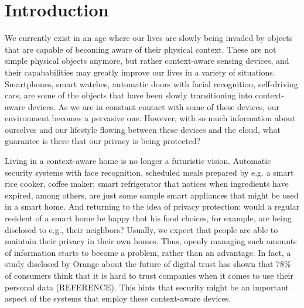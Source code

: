\documentclass[12pt]{article}
\newcommand{\TODO}{\todo[inline]}
\begin{document}


\newpage
\tableofcontents


\newpage
{}%


\newpage
\section{Introduction}

\TODO{(ref) references}

We currently exist in an age where our lives are slowly being invaded by objects that are capable of becoming aware of their physical context. These are not simple physical objects anymore, but rather context-aware sensing devices, and their capababilities may greatly improve our lives in a variety of situations. Smartphones, smart watches, automatic doors with facial recognition, self-driving cars, are some of the objects that have been slowly transitioning into context-aware devices. As we are in constant contact with some of these devices, our environment becomes a pervasive one. However, with so much information about ourselves and our lifestyle flowing between these devices and the cloud, what guarantee is there that our privacy is being protected?

Living in a context-aware home is no longer a futuristic vision. Automatic security systems with face recognition, scheduled meals prepared by e.g. a smart rice cooker, coffee maker; smart refrigerator that notices when ingredients have expired, among others, are just some sample smart appliances that might be used in a smart home. And returning to the idea of privacy protection: would a regular resident of a smart home be happy that his food choices, for example, are being disclosed to e.g., their neighbors? Usually, we expect that people are able to maintain their privacy in their own homes. Thus, openly managing such amounts of information starts to become a problem, rather than an advantage. In fact, a study disclosed by Orange about the future of digital trust has shown that 78\% of consumers think that it is hard to trust companies when it comes to use their personal data (REFERENCE). This hints that security might be an important aspect of the systems that employ these context-aware devices. 
\end{document}
